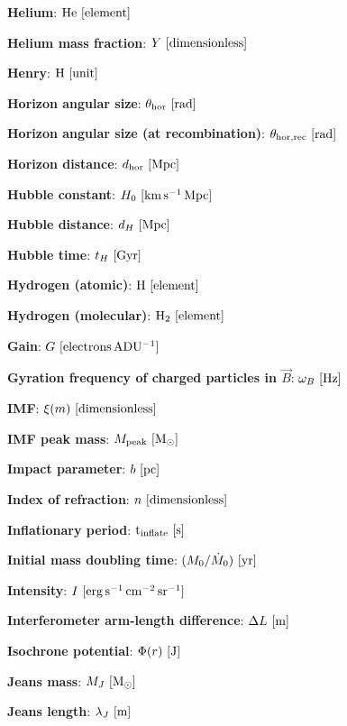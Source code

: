\documentclass[a4paper,10pt]{article}
\begin{document}
{\noindent}\textbf{Helium}: ${\rm He} ~ [{\rm element}]$

{\noindent}\textbf{Helium mass fraction}: $Y ~ [{\rm dimensionless}]$

{\noindent}\textbf{Henry}: ${\rm H} ~ [{\rm unit}]$

{\noindent}\textbf{Horizon angular size}: $\theta_\mathrm{hor} ~ [{\rm rad}]$

{\noindent}\textbf{Horizon angular size (at recombination)}: $\theta_\mathrm{hor,rec} ~ [{\rm rad}]$

{\noindent}\textbf{Horizon distance}: $d_\mathrm{hor} ~ [{\rm Mpc}]$

{\noindent}\textbf{Hubble constant}: $H_0 ~ [{\rm km\,s^{-1}\,Mpc}]$

{\noindent}\textbf{Hubble distance}: $d_H ~ [{\rm Mpc}]$

{\noindent}\textbf{Hubble time}: $t_H ~ [{\rm Gyr}]$

{\noindent}\textbf{Hydrogen (atomic)}: ${\rm H} ~ [{\rm element}]$

{\noindent}\textbf{Hydrogen (molecular)}: ${\rm H_2} ~ [{\rm element}]$

{\noindent}\textbf{Gain}: $G ~ [{\rm electrons\,ADU^{-1}}]$

{\noindent}\textbf{Gyration frequency of charged particles in $\vec{B}$}: $\omega_B ~ [{\rm Hz}]$

{\noindent}\textbf{IMF}: $\xi(m) ~ [{\rm dimensionless}]$

{\noindent}\textbf{IMF peak mass}: $M_\mathrm{peak} ~ [{\rm M_\odot}]$

{\noindent}\textbf{Impact parameter}: $b ~ [{\rm pc}]$

{\noindent}\textbf{Index of refraction}: $n ~ [{\rm dimensionless}]$

{\noindent}\textbf{Inflationary period}: ${\rm t_\mathrm{inflate}} ~ [{\rm s}]$

{\noindent}\textbf{Initial mass doubling time}: $(M_0/\dot{M}_0) ~ [{\rm yr}]$

{\noindent}\textbf{Intensity}: $I ~ [{\rm erg\,s^{-1}\,cm^{-2}\,sr^{-1}}]$

{\noindent}\textbf{Interferometer arm-length difference}: $\Delta L ~ [{\rm m}]$

{\noindent}\textbf{Isochrone potential}: $\Phi(r) ~ [{\rm J}]$

{\noindent}\textbf{Jeans mass}: $M_J ~ [{\rm M_\odot}]$

{\noindent}\textbf{Jeans length}: $\lambda_J ~ [{\rm m}]$
\end{document}
